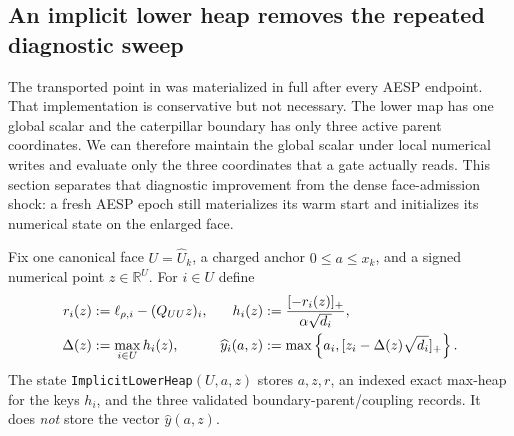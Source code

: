 \subsection{An implicit lower heap removes the repeated diagnostic sweep}
\label{sec:branch-caterpillar-implicit-lower-heap}

The transported point in
 was materialized in
full after every AESP endpoint.  That implementation is conservative but not
necessary.  The lower map has one global scalar and the caterpillar boundary
has only three active parent coordinates.  We can therefore maintain the
global scalar under local numerical writes and evaluate only the three
coordinates that a gate actually reads.  This section separates that
diagnostic improvement from the dense face-admission shock: a fresh AESP
epoch still materializes its warm start and initializes its numerical state
on the enlarged face.

Fix one canonical face $U=\widehat U_k$, a charged anchor
$0\leq a\leq x_k$, and a signed numerical point $z\in\mathbb R^U$.  For
$i\in U$ define
\begin{align}
 r_i(z)&:=\ell_{\rho,i}-(Q_{UU}z)_i,
 &
 h_i(z)&:=\frac{[-r_i(z)]_+}{\alpha\sqrt{d_i}},
 \notag\\
 \Delta(z)&:=\max_{i\in U}h_i(z),
 &
 \widehat y_i(a,z)&:=
 \max\left\{a_i,[z_i-\Delta(z)\sqrt{d_i}]_+\right\}.
 \label{eq:branch-caterpillar-implicit-lower-state}
\end{align}
The state \texttt{ImplicitLowerHeap}$(U,a,z)$ stores $a,z,r$, an indexed
exact max-heap for the keys $h_i$, and the three validated
boundary-parent/coupling records.  It does \emph{not} store the vector
$\widehat y(a,z)$.

